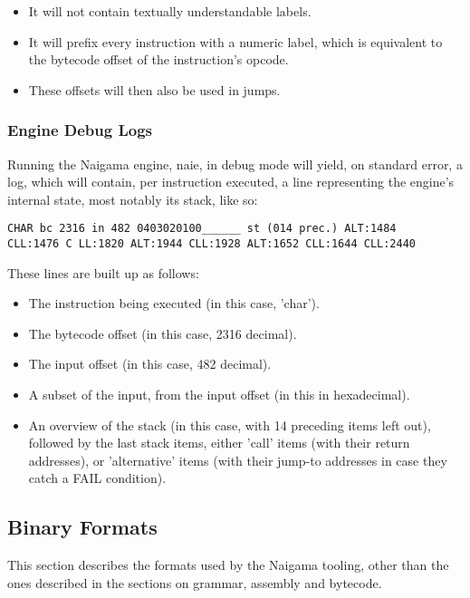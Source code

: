 \begin{itemize}
\item It will not contain textually understandable labels.
\item It will prefix every instruction with a numeric label, which is
      equivalent to the bytecode offset of the instruction's opcode.
\item These offsets will then also be used in jumps.
\end{itemize}

\subsubsection{Engine Debug Logs}

Running the Naigama engine, naie, in debug mode will yield, on standard error,
a log, which will contain, per instruction executed, a line representing
the engine's internal state, most notably its stack, like so:

\begin{myquote}
\begin{verbatim}
CHAR bc 2316 in 482 0403020100______ st (014 prec.) ALT:1484
CLL:1476 C LL:1820 ALT:1944 CLL:1928 ALT:1652 CLL:1644 CLL:2440
\end{verbatim}
\end{myquote}

These lines are built up as follows:

\begin{itemize}
\item The instruction being executed (in this case, 'char').
\item The bytecode offset (in this case, 2316 decimal).
\item The input offset (in this case, 482 decimal).
\item A subset of the input, from the input offset (in this in hexadecimal).
\item An overview of the stack (in this case, with 14 preceding items left
      out), followed by the last stack items, either 'call' items
      (with their return addresses), or 'alternative' items
      (with their jump-to addresses in case they catch a FAIL condition).
\end{itemize}

\subsection{Binary Formats}

This section describes the formats used by the Naigama tooling, other than
the ones described in the sections on grammar, assembly and bytecode.


